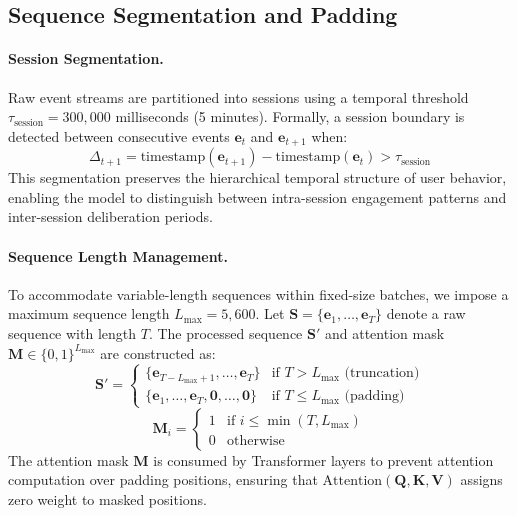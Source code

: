 \subsection{Sequence Segmentation and Padding}
\label{app:sequence_processing}

\paragraph{Session Segmentation.}
Raw event streams are partitioned into sessions using a temporal threshold $\tau_{\text{session}} = 300{,}000$ milliseconds (5 minutes). Formally, a session boundary is detected between consecutive events $\mathbf{e}_t$ and $\mathbf{e}_{t+1}$ when:
\begin{equation}
\Delta_{t+1} = \text{timestamp}(\mathbf{e}_{t+1}) - \text{timestamp}(\mathbf{e}_t) > \tau_{\text{session}}
\end{equation}
This segmentation preserves the hierarchical temporal structure of user behavior, enabling the model to distinguish between intra-session engagement patterns and inter-session deliberation periods.

\paragraph{Sequence Length Management.}
To accommodate variable-length sequences within fixed-size batches, we impose a maximum sequence length $L_{\max} = 5{,}600$. Let $\mathbf{S} = \{\mathbf{e}_1, \ldots, \mathbf{e}_T\}$ denote a raw sequence with length $T$. The processed sequence $\mathbf{S}'$ and attention mask $\mathbf{M} \in \{0,1\}^{L_{\max}}$ are constructed as:
\begin{equation}
\mathbf{S}' = \begin{cases}
\{\mathbf{e}_{T-L_{\max}+1}, \ldots, \mathbf{e}_T\} & \text{if } T > L_{\max} \text{ (truncation)} \\
\{\mathbf{e}_1, \ldots, \mathbf{e}_T, \mathbf{0}, \ldots, \mathbf{0}\} & \text{if } T \leq L_{\max} \text{ (padding)}
\end{cases}
\end{equation}
\begin{equation}
\mathbf{M}_i = \begin{cases}
1 & \text{if } i \leq \min(T, L_{\max}) \\
0 & \text{otherwise}
\end{cases}
\end{equation}
The attention mask $\mathbf{M}$ is consumed by Transformer layers to prevent attention computation over padding positions, ensuring that $\text{Attention}(\mathbf{Q}, \mathbf{K}, \mathbf{V})$ assigns zero weight to masked positions.

